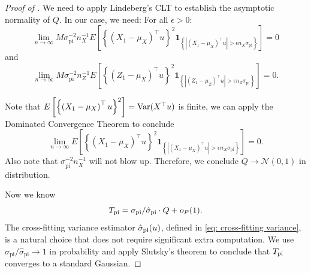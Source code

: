\documentclass[11pt]{article}
\begin{document}
\begin{proof}[Proof of ]
We need to apply Lindeberg's CLT to establish the asymptotic normality of $Q$. In our case, we need: For all $\epsilon >0$:
\begin{equation}
\lim_{n\rightarrow\infty}M \sigma_{\mathrm{pi}}^{-2} n_X^{-1} E\left[\left\{\left(X_1-\mu_X\right)^{\top} u\right\}^2 \mathbf{1}_{\left\{\left|\left(X_1-\mu_X\right)^{\top} u\right|>\epsilon n_X\sigma_{\mathrm{pi}}\right\}}\right]= 0
\end{equation}
and
\begin{equation}
\lim_{n\rightarrow\infty}M \sigma_{\mathrm{pi}}^{-2} n_Z^{-1} E\left[\left\{\left(Z_1-\mu_X\right)^{\top} u\right\}^2 \mathbf{1}_{\left\{\left|\left(Z_1-\mu_Z\right)^{\top} u\right|>\epsilon n_Z\sigma_{\mathrm{pi}}\right\}}\right]= 0.
\end{equation}

Note that $E\left[\left\{\left(X_1-\mu_X\right)^{\top} u\right\}^2\right] = {\rm Var}(X^\top u)$ is finite, we can apply the Dominated Convergence Theorem to conclude 
\begin{equation}
    \lim_{n\rightarrow\infty} E\left[\left\{\left(X_1-\mu_X\right)^{\top} u\right\}^2 \mathbf{1}_{\left\{\left|\left(X_1-\mu_X\right)^{\top} u\right|>\epsilon n_X \sigma_{\mathrm{pi}}\right\}}\right]= 0.
\end{equation}
Also note that $\sigma_{\mathrm{pi}}^{-2} n_X^{-1}$ will not blow up. Therefore, we conclude $Q\rightarrow \mathcal{N}(0,1)$ in distribution.

Now we know 
\begin{equation}
  T_{\rm pi} = \sigma_{\rm pi} / \hat\sigma_{\rm pi} \cdot Q  +o_P(1).
\end{equation}
The cross-fitting variance estimator $\hat\sigma_{\rm pi}(u)$, defined in \eqref{eq: cross-fitting variance}, is a natural choice that does not require significant extra computation. We use $\sigma_{\mathrm{pi}} / \hat{\sigma}_{\mathrm{pi}} \rightarrow 1$ in probability and apply Slutsky's theorem to conclude that $T_{\rm pi}$ converges to a standard Gaussian.
    
\end{proof}

\end{document}
